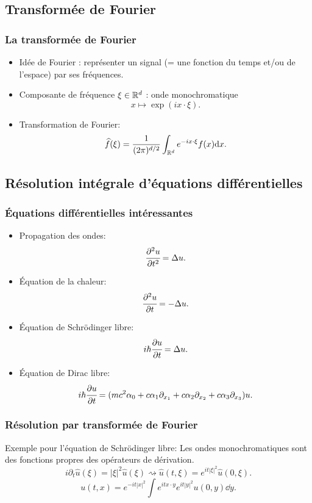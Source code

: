\documentclass[mathserif]{beamer}
\begin{document}
\subsection{Transformée de Fourier}
\begin{frame}
  \frametitle{La transformée de Fourier}
  \begin{itemize}
  \item Idée de Fourier : représenter un signal (= une fonction du
    temps et/ou de l'espace) par ses fréquences.
  \item Composante de fréquence $\xi \in \mathbb{R}^d$ : onde monochromatique
    \[
      x\mapsto \exp(ix\cdot \xi).
    \]
    
  \item Transformation de Fourier:
    \[
      \widehat{f}(\xi)=\frac{1}{(2\pi)^{d/2}}\int_{\mathbb{R}^d}e^{-ix\cdot
        \xi}f(x) \mathrm{d} x.
    \]
    
  \end{itemize}
\end{frame}

\subsection{Résolution intégrale d'équations différentielles}
\begin{frame}
  \frametitle{Équations différentielles intéressantes}
  \begin{itemize}
  \item Propagation des ondes:
    \[
      \cfrac{\partial^2 u}{\partial t^2}=\Delta u.
    \]
    
  \item Équation de la chaleur:
    \[
      \cfrac{\partial^2 u}{\partial t}=-\Delta u.
    \]
    
  \item Équation de Schrödinger libre:
    \[
      i\hbar\cfrac{\partial u}{\partial t}=\Delta u.
    \]
  \item Équation de Dirac libre:
    \[
      i\hbar\cfrac{\partial u}{\partial
        t}=(mc^2\alpha_0+c\alpha_1\partial_{x_1}+c\alpha_2\partial_{x_2}+c\alpha_3\partial_{x_3})u.
      \]
  \end{itemize}
\end{frame}

\begin{frame}
  \frametitle{Résolution par transformée de Fourier}
  Exemple pour l'équation de Schrödinger libre:
  Les ondes monochromatiques sont des fonctions propres des
    opérateurs de dérivation.
  \[i\partial_t
    \widehat{u}(\xi)=|\xi|^2\widehat{u}(\xi)\rightsquigarrow
    \widehat{u}(t,\xi)=e^{it|\xi|^2}\widehat{u}(0,\xi).\]
  \[u(t,x)=e^{-it|x|^2}\int e^{itx\cdot y}e^{it|y|^2}u(0,y)\dd y.\]

\end{frame}
\end{document}

